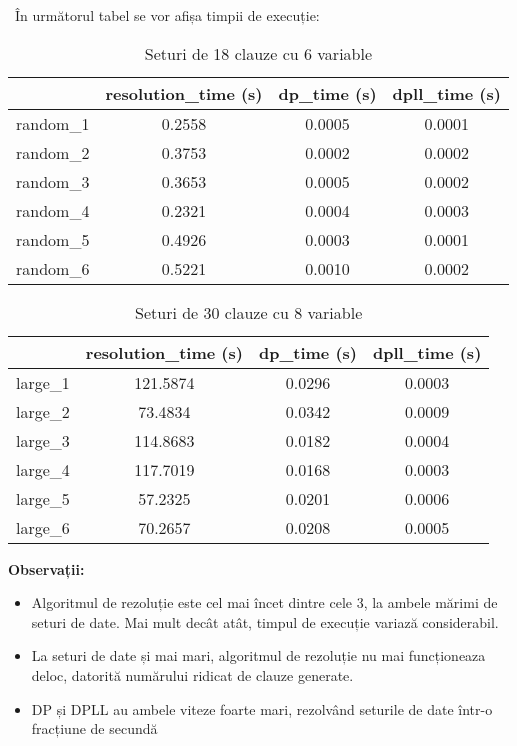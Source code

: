 \documentclass[12pt]{article}
\begin{document}
\ În următorul tabel se vor afișa timpii de execuție:
\begin{table}[h]
    \centering
    \begin{tabular}{|c|c|c|c|}
        \hline
        & resolution\_time (s) & dp\_time (s) & dpll\_time (s) \\
        \hline
        random\_1 & 0.2558 & 0.0005 & 0.0001 \\
        random\_2 & 0.3753 & 0.0002 & 0.0002 \\
        random\_3 & 0.3653 & 0.0005 & 0.0002 \\
        random\_4 & 0.2321 & 0.0004 & 0.0003 \\
        random\_5 & 0.4926 & 0.0003 & 0.0001 \\
        random\_6 & 0.5221 & 0.0010 & 0.0002 \\
        \hline
    \end{tabular}
    \caption{Seturi de 18 clauze cu 6 variable}
    \label{tab:sample_data}
\end{table}
\begin{table}[h]
    \centering
    \begin{tabular}{|c|c|c|c|}
        \hline
        & resolution\_time (s) & dp\_time (s) & dpll\_time (s) \\
        \hline
        large\_1 & 121.5874  & 0.0296 & 0.0003 \\
        large\_2 & 73.4834 & 0.0342 & 0.0009 \\
        large\_3 & 114.8683 & 0.0182 & 0.0004 \\
        large\_4 & 117.7019 & 0.0168 & 0.0003 \\
        large\_5 & 57.2325 & 0.0201 & 0.0006 \\
        large\_6 & 70.2657 & 0.0208  & 0.0005 \\
        \hline
    \end{tabular}
    \caption{Seturi de 30 clauze cu 8 variable}
    \label{tab:sample_data}
\end{table}
\newpage
\textbf{\large{Observații:}}
\\
\begin{itemize}
    \item Algoritmul de rezoluție este cel mai încet dintre cele 3, la ambele mărimi de seturi de date. Mai mult decât atât, timpul de execuție variază considerabil.
    \item La seturi de date și mai mari, algoritmul de rezoluție nu mai funcționeaza deloc, datorită numărului ridicat de clauze generate.
    \item DP și DPLL au ambele viteze foarte mari, rezolvând seturile de date într-o fracțiune de secundă
\end{itemize}
\end{document}
